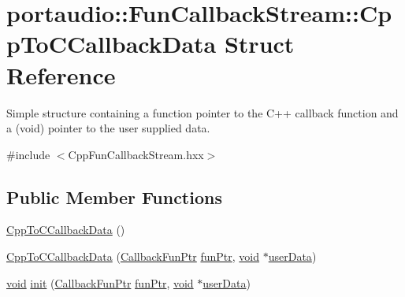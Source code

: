 \hypertarget{structportaudio_1_1_fun_callback_stream_1_1_cpp_to_c_callback_data}{}\section{portaudio\+:\+:Fun\+Callback\+Stream\+:\+:Cpp\+To\+C\+Callback\+Data Struct Reference}
\label{structportaudio_1_1_fun_callback_stream_1_1_cpp_to_c_callback_data}


Simple structure containing a function pointer to the C++ callback function and a (void) pointer to the user supplied data.  




{\ttfamily \#include $<$Cpp\+Fun\+Callback\+Stream.\+hxx$>$}

\subsection*{Public Member Functions}
\begin{DoxyCompactItemize}
\item 
\hyperlink{structportaudio_1_1_fun_callback_stream_1_1_cpp_to_c_callback_data_a1ef79b6dc3a8dd702a800985a149200a}{Cpp\+To\+C\+Callback\+Data} ()
\item 
\hyperlink{structportaudio_1_1_fun_callback_stream_1_1_cpp_to_c_callback_data_aad61966bc222d7f619a50213bb9366ca}{Cpp\+To\+C\+Callback\+Data} (\hyperlink{classportaudio_1_1_fun_callback_stream_abad4a65493bda517c7df8d7cee847784}{Callback\+Fun\+Ptr} \hyperlink{structportaudio_1_1_fun_callback_stream_1_1_cpp_to_c_callback_data_a0294c57e13534e8892e40890b33f77ab}{fun\+Ptr}, \hyperlink{sound_8c_ae35f5844602719cf66324f4de2a658b3}{void} $\ast$\hyperlink{structportaudio_1_1_fun_callback_stream_1_1_cpp_to_c_callback_data_af10d25bb7290b07e6831ba3d2ad58e47}{user\+Data})
\item 
\hyperlink{sound_8c_ae35f5844602719cf66324f4de2a658b3}{void} \hyperlink{structportaudio_1_1_fun_callback_stream_1_1_cpp_to_c_callback_data_a11afe75709540cd378b620ad33a6f23a}{init} (\hyperlink{classportaudio_1_1_fun_callback_stream_abad4a65493bda517c7df8d7cee847784}{Callback\+Fun\+Ptr} \hyperlink{structportaudio_1_1_fun_callback_stream_1_1_cpp_to_c_callback_data_a0294c57e13534e8892e40890b33f77ab}{fun\+Ptr}, \hyperlink{sound_8c_ae35f5844602719cf66324f4de2a658b3}{void} $\ast$\hyperlink{structportaudio_1_1_fun_callback_stream_1_1_cpp_to_c_callback_data_af10d25bb7290b07e6831ba3d2ad58e47}{user\+Data})
\end{DoxyCompactItemize}
